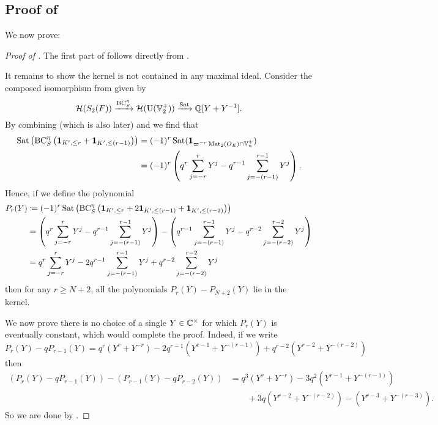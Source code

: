 \subsection{Proof of }
We now prove:
\semiliekerlarge*

\begin{proof}[Proof of ]
The first part of  follows directly from
.

It remains to show the kernel is not contained in any maximal ideal.
Consider the composed isomorphism from 
given by
\[ \mathcal H(S_2(F)) \xrightarrow{\operatorname{BC}^\eta_S} \mathcal H(\operatorname{U}(\mathbb V_2^+)) \xrightarrow{\operatorname{Sat}} \mathbb Q[Y + Y^{-1}]. \]
By combining \cite[Equation (7.1.9)]{ref:AFLspherical}
(which is also  later)
and \cite[Equation (7.1.4)]{ref:AFLspherical}
we find that
\begin{align*}
  \operatorname{Sat}\left(\operatorname{BC}^\eta_S\left(\mathbf{1}_{K', \le r} + \mathbf{1}_{K', \le (r-1)}\right)\right)
  &= (-1)^r \operatorname{Sat}(\mathbf{1}_{\varpi^{-r} \operatorname{Mat}_2(O_E) \cap \mathbb V_n^+}) \\
  &= (-1)^r \left( q^r \sum_{j=-r}^r Y^j - q^{r-1} \sum_{j=-(r-1)}^{r-1} Y^j \right).
\end{align*}
Hence, if we define the polynomial
\begin{align*}
  P_r(Y) &\coloneqq (-1)^r \operatorname{Sat}\left(\operatorname{BC}^\eta_S\left(
    \mathbf{1}_{K', \le r} + 2\mathbf{1}_{K', \le (r-1)}
    + \mathbf{1}_{K', \le (r-2)} \right)\right) \\
  &= \left( q^r \sum_{j=-r}^r Y^j - q^{r-1} \sum_{j=-(r-1)}^{r-1} Y^j \right)
    - \left( q^{r-1} \sum_{j=-(r-1)}^{r-1} Y^j - q^{r-2} \sum_{j=-(r-2)}^{r-2} Y^j \right) \\
  &= q^r \sum_{j=-r}^r Y^j - 2q^{r-1} \sum_{j=-(r-1)}^{r-1} Y^j + q^{r-2} \sum_{j=-(r-2)}^{r-2} Y^j
\end{align*}
then for any $r \ge N+2$,
all the polynomials $P_r(Y) - P_{N+2}(Y)$ lie in the kernel.

We now prove there is no choice of a single $Y \in \mathbb C^\times$ for which
$P_r(Y)$ is eventually constant, which would complete the proof.
Indeed, if we write
\[
  P_r(Y) - q P_{r-1}(Y)
  = q^r(Y^r + Y^{-r}) - 2q^{r-1} (Y^{r-1} + Y^{-(r-1)}) + q^{r-2}(Y^{r-2} + Y^{-(r-2)})
\]
then
\begin{align*}
  (P_r(Y) - q P_{r-1}(Y)) - (P_{r-1}(Y) - q P_{r-2}(Y))
  &= q^3(Y^r + Y^{-r}) - 3q^2(Y^{r-1} + Y^{-(r-1)}) \\
  &\qquad + 3q(Y^{r-2} + Y^{-(r-2)}) - (Y^{r-3} + Y^{-(r-3)}).
\end{align*}
So we are done by .
\end{proof}

